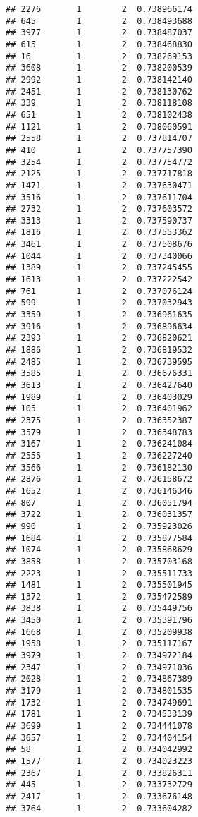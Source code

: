 \documentclass[
]{article}
\begin{document}
\begin{verbatim}
## 2276       1        2  0.738966174
## 645        1        2  0.738493688
## 3977       1        2  0.738487037
## 615        1        2  0.738468830
## 16         1        2  0.738269153
## 3608       1        2  0.738200539
## 2992       1        2  0.738142140
## 2451       1        2  0.738130762
## 339        1        2  0.738118108
## 651        1        2  0.738102438
## 1121       1        2  0.738060591
## 2558       1        2  0.737814707
## 410        1        2  0.737757390
## 3254       1        2  0.737754772
## 2125       1        2  0.737717818
## 1471       1        2  0.737630471
## 3516       1        2  0.737611704
## 2732       1        2  0.737603572
## 3313       1        2  0.737590737
## 1816       1        2  0.737553362
## 3461       1        2  0.737508676
## 1044       1        2  0.737340066
## 1389       1        2  0.737245455
## 1613       1        2  0.737222542
## 761        1        2  0.737076124
## 599        1        2  0.737032943
## 3359       1        2  0.736961635
## 3916       1        2  0.736896634
## 2393       1        2  0.736820621
## 1886       1        2  0.736819532
## 2485       1        2  0.736739595
## 3585       1        2  0.736676331
## 3613       1        2  0.736427640
## 1989       1        2  0.736403029
## 105        1        2  0.736401962
## 2375       1        2  0.736352387
## 3579       1        2  0.736348783
## 3167       1        2  0.736241084
## 2555       1        2  0.736227240
## 3566       1        2  0.736182130
## 2876       1        2  0.736158672
## 1652       1        2  0.736146346
## 807        1        2  0.736051794
## 3722       1        2  0.736031357
## 990        1        2  0.735923026
## 1684       1        2  0.735877584
## 1074       1        2  0.735868629
## 3858       1        2  0.735703168
## 2223       1        2  0.735511733
## 1481       1        2  0.735501945
## 1372       1        2  0.735472589
## 3838       1        2  0.735449756
## 3450       1        2  0.735391796
## 1668       1        2  0.735209938
## 1958       1        2  0.735117167
## 3979       1        2  0.734972184
## 2347       1        2  0.734971036
## 2028       1        2  0.734867389
## 3179       1        2  0.734801535
## 1732       1        2  0.734749691
## 1781       1        2  0.734533139
## 3699       1        2  0.734441078
## 3657       1        2  0.734404154
## 58         1        2  0.734042992
## 1577       1        2  0.734023223
## 2367       1        2  0.733826311
## 445        1        2  0.733732729
## 2417       1        2  0.733676148
## 3764       1        2  0.733604282

\end{verbatim}
\end{document}
